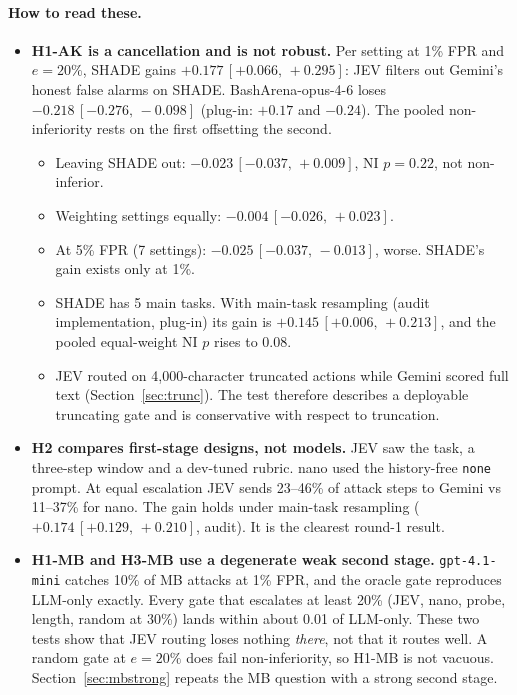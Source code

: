 \documentclass[11pt]{article}
\newcommand{\ci}[2]{\,[#1,\,#2]}
\begin{document}
\paragraph{How to read these.}
\begin{itemize}
\item \textbf{H1-AK is a cancellation and is not robust.} Per setting at 1\% FPR and $e=20\%$, SHADE gains $+0.177\ci{+0.066}{+0.295}$: JEV filters out Gemini's honest false alarms on SHADE. BashArena-opus-4-6 loses $-0.218\ci{-0.276}{-0.098}$ (plug-in: $+0.17$ and $-0.24$). The pooled non-inferiority rests on the first offsetting the second.
  \begin{itemize}
  \item Leaving SHADE out: $-0.023\ci{-0.037}{+0.009}$, NI $p=0.22$, not non-inferior.
  \item Weighting settings equally: $-0.004\ci{-0.026}{+0.023}$.
  \item At 5\% FPR (7 settings): $-0.025\ci{-0.037}{-0.013}$, worse. SHADE's gain exists only at 1\%.
  \item SHADE has 5 main tasks. With main-task resampling (audit implementation, plug-in) its gain is $+0.145\ci{+0.006}{+0.213}$, and the pooled equal-weight NI $p$ rises to 0.08.
  \item JEV routed on 4{,}000-character truncated actions while Gemini scored full text (Section~\ref{sec:trunc}). The test therefore describes a deployable truncating gate and is conservative with respect to truncation.
  \end{itemize}
\item \textbf{H2 compares first-stage designs, not models.} JEV saw the task, a three-step window and a dev-tuned rubric. nano used the history-free \texttt{none} prompt. At equal escalation JEV sends 23--46\% of attack steps to Gemini vs 11--37\% for nano. The gain holds under main-task resampling ($+0.174\ci{+0.129}{+0.210}$, audit). It is the clearest round-1 result.
\item \textbf{H1-MB and H3-MB use a degenerate weak second stage.} \texttt{gpt-4.1-mini} catches 10\% of MB attacks at 1\% FPR, and the oracle gate reproduces LLM-only exactly. Every gate that escalates at least 20\% (JEV, nano, probe, length, random at 30\%) lands within about 0.01 of LLM-only. These two tests show that JEV routing loses nothing \emph{there}, not that it routes well. A random gate at $e=20\%$ does fail non-inferiority, so H1-MB is not vacuous. Section~\ref{sec:mbstrong} repeats the MB question with a strong second stage.
\end{itemize}
\end{document}
